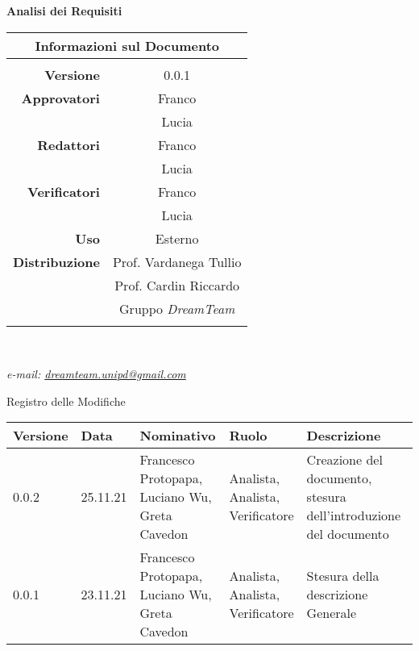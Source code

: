 \documentclass[letterpaper]{article}
\begin{document}
\begin{center}
{\Huge{\textbf{Analisi dei Requisiti}}} \\ [1cm]

\begin{table}[htbp]
\centering
\begin{tabular}{r|c}
\multicolumn{2}{c}{\textbf{Informazioni sul Documento}} \\
\hline \\
\textbf{Versione} & 0.0.1 \\ \rule{0pt}{3ex}    
\textbf{Approvatori} & Franco \\ \rule{0pt}{2ex}   
& Lucia \\ \rule{0pt}{3ex}    
\textbf{Redattori} & Franco \\ \rule{0pt}{2ex}   
& Lucia \\ \rule{0pt}{3ex}    
\textbf{Verificatori} & Franco \\ \rule{0pt}{2ex}   
& Lucia \\ \rule{0pt}{3ex}    
\textbf{Uso} & Esterno \\ \rule{0pt}{3ex}    
\textbf{Distribuzione} & Prof. Vardanega Tullio \\ \rule{0pt}{2ex}   
& Prof. Cardin Riccardo \\ \rule{0pt}{2ex}   
& Gruppo \textit{DreamTeam} \\ \rule{0pt}{0.1cm}   
\end{tabular} \\ [0.5cm]
\end{table}

\textsl{ e-mail: \href{mailto:dreamteam.unipd@gmail.com}{dreamteam.unipd@gmail.com} } \\[2cm]
\end{center}
\pagebreak


Registro delle Modifiche
\begin{table}
	\begin{tabular}{|m{}<{\centering}|m{}<{\centering}|m{}<{\centering}|m{}<{\centering}|m{}<{\centering}|}
    \hline \rowcolor{gray!50}
    \textbf{Versione}&\textbf{Data}&\textbf{Nominativo}&\textbf{Ruolo}&\textbf{Descrizione}\\
    \hline
    0.0.2&25.11.21&\shortstack {Francesco Protopapa,\\Luciano Wu,\\Greta Cavedon}&\shortstack{Analista,\\Analista,\\Verificatore}&Creazione del documento, stesura dell’introduzione del documento\\
    \hline 
    0.0.1&23.11.21&\shortstack{Francesco Protopapa,\\Luciano Wu,\\Greta Cavedon}&\shortstack{Analista,\\Analista,\\Verificatore}&Stesura della descrizione Generale\\
    \hline
  \end{tabular}
\end{table}
\end{document}
